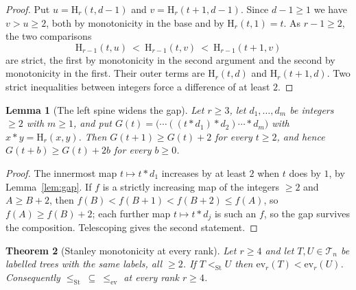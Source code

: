 \documentclass[11pt,a4paper]{article}
\theoremstyle{plain}
\newtheorem{theorem}{Theorem}[section]
\newtheorem{lemma}[theorem]{Lemma}
\theoremstyle{definition}
\newcommand{\HH}{\mathrm{H}}
\newcommand{\ev}{\mathrm{ev}}
\newcommand{\Tam}{\mathcal{T}}
\newcommand{\St}{\mathrm{St}}
\begin{document}
\begin{proof}
Put $u=\HH_r(t,d-1)$ and $v=\HH_r(t+1,d-1)$. Since $d-1\ge1$ we have $v>u\ge2$, both by
monotonicity in the base and by $\HH_r(t,1)=t$. As $r-1\ge2$, the two comparisons
\[
  \HH_{r-1}(t,u)\ <\ \HH_{r-1}(t,v)\ <\ \HH_{r-1}(t+1,v)
\]
are strict, the first by monotonicity in the second argument and the second by
monotonicity in the first. Their outer terms are $\HH_r(t,d)$ and $\HH_r(t+1,d)$. Two
strict inequalities between integers force a difference of at least $2$.
\end{proof}

\begin{lemma}[The left spine widens the gap]\label{lem:Ggap}
Let $r\ge3$, let $d_1,\dots,d_m$ be integers $\ge2$ with $m\ge1$, and put
$G(t)=\bigl(\cdots((t*d_1)*d_2)\cdots*d_m\bigr)$ with $x*y=\HH_r(x,y)$. Then
$G(t+1)\ge G(t)+2$ for every $t\ge2$, and hence $G(t+b)\ge G(t)+2b$ for every $b\ge0$.
\end{lemma}

\begin{proof}
The innermost map $t\mapsto t*d_1$ increases by at least $2$ when $t$ does by $1$, by
Lemma~\ref{lem:gap}. If $f$ is a strictly increasing map of the integers $\ge2$ and
$A\ge B+2$, then $f(B)<f(B+1)<f(B+2)\le f(A)$, so $f(A)\ge f(B)+2$; each further map
$t\mapsto t*d_j$ is such an $f$, so the gap survives the composition. Telescoping gives
the second statement.
\end{proof}

\begin{theorem}[Stanley monotonicity at every rank]\label{thm:strank}
Let $r\ge4$ and let $T,U\in\Tam_n$ be labelled trees with the same labels, all $\ge2$.
If $T<_{\St}U$ then $\ev_r(T)<\ev_r(U)$. Consequently
$\le_{\St}\ \subseteq\ \le_{\ev}$ at every rank $r\ge4$.
\end{theorem}
\end{document}
